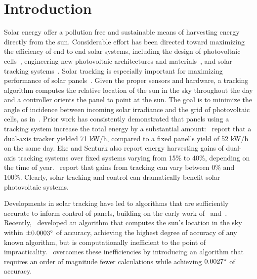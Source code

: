 \documentclass[11pt]{article}
\begin{document}
\section{Introduction}
Solar energy offer a pollution free and sustainable means of harvesting energy directly from the sun. Considerable effort has been directed toward maximizing the efficiency of end to end solar systems, including the design of photovoltaic cells~\cite{Jervase2001,li2012molecular}, engineering new photovoltaic architectures and materials~\cite{li2005high}, and solar tracking systems~\cite{camacho2012control}. Solar tracking is especially important for maximizing performance of solar panels~\cite{Eke2012,Rizk2008,King2001}. Given the proper sensors and hardware, a tracking algorithm computes the relative location of the sun in the sky throughout the day and a controller orients the panel to point at the sun. The goal is to minimize the angle of incidence between incoming solar irradiance and the grid of photovoltaic cells, as in~\citet{Eke2012,Benghanem2011,King2001, kalogirou1996design}. Prior work has consistently demonstrated that panels using a tracking system increase the total energy by a substantial amount:~\citet{Eke2012} report that a dual-axis tracker yielded 71 kW/h, compared to a fixed panel's yield of 52 kW/h on the same day. Eke and Senturk also report energy harvesting gains of dual-axis tracking systems over fixed systems varying from 15\% to 40\%, depending on the time of year.~\citet{mousazadeh2009review} report that gains from tracking can vary between 0\% and 100\%. Clearly, solar tracking and control can dramatically benefit solar photovoltaic systems.

Developments in solar tracking have led to algorithms that are sufficiently accurate to inform control of panels, building on the early work of~\citet{spencer1971fourier,walraven1978calculating} and~\citet{michalsky1988astronomical}. Recently,~\citet{reda2004solar} developed an algorithm that computes the sun's location in the sky within $\pm 0.0003\degree$ of accuracy, achieving the highest degree of accuracy of any known algorithm, but is computationally inefficient to the point of impracticality.~\citet{Grena2008} overcomes these inefficiencies by introducing an algorithm that requires an order of magnitude fewer calculations while achieving $0.0027\degree$ of accuracy.
\end{document}
